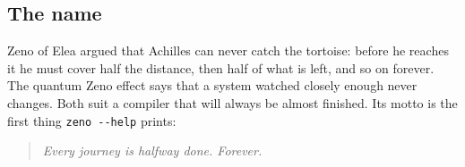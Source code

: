 \subsection*{The name}

Zeno of Elea argued that Achilles can never catch the tortoise: before
he reaches it he must cover half the distance, then half of what is
left, and so on forever. The quantum Zeno effect says that a system
watched closely enough never changes. Both suit a compiler that will
always be almost finished. Its motto is the first thing \verb|zeno --help| prints:

\begin{quote}
\emph{Every journey is halfway done. Forever.}
\end{quote}
